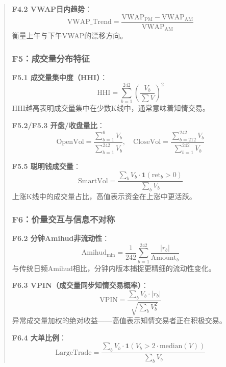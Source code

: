 \documentclass[12pt,a4paper]{article}
\begin{document}
\begin{abstract}
\textbf{F4.2 VWAP日内趋势}：
\begin{equation}
    \text{VWAP\_Trend} = \frac{\text{VWAP}_{\text{PM}} - \text{VWAP}_{\text{AM}}}{\text{VWAP}_{\text{AM}}}
\end{equation}
衡量上午与下午VWAP的漂移方向。

\subsubsection{F5：成交量分布特征}

\textbf{F5.1 成交量集中度（HHI）}：
\begin{equation}
    \text{HHI} = \sum_{b=1}^{242} \left(\frac{V_b}{\sum V}\right)^2
\end{equation}
HHI越高表明成交量集中在少数K线中，通常意味着知情交易。

\textbf{F5.2/F5.3 开盘/收盘量比}：
\begin{equation}
    \text{OpenVol} = \frac{\sum_{b=1}^{6} V_b}{\sum_{b=1}^{242} V_b}, \quad \text{CloseVol} = \frac{\sum_{b=212}^{242} V_b}{\sum_{b=1}^{242} V_b}
\end{equation}

\textbf{F5.5 聪明钱成交量}：
\begin{equation}
    \text{SmartVol} = \frac{\sum_b V_b \cdot \mathbf{1}(\text{ret}_b > 0)}{\sum_b V_b}
\end{equation}
上涨K线中的成交量占比，高值表示资金在上涨中更活跃。

\subsubsection{F6：价量交互与信息不对称}

\textbf{F6.2 分钟Amihud非流动性}：
\begin{equation}
    \text{Amihud}_{\text{min}} = \frac{1}{242}\sum_{b=1}^{242} \frac{|r_b|}{\text{Amount}_b}
\end{equation}
与传统日频Amihud相比，分钟内版本捕捉更精细的流动性变化。

\textbf{F6.3 VPIN（成交量同步知情交易概率）}：
\begin{equation}
    \text{VPIN} = \frac{\sum_b V_b \cdot |r_b|}{\sqrt{\sum_b V_b^2}}
\end{equation}
异常成交量加权的绝对收益——高值表示知情交易者正在积极交易。

\textbf{F6.4 大单比例}：
\begin{equation}
    \text{LargeTrade} = \frac{\sum_b V_b \cdot \mathbf{1}(V_b > 2 \cdot \text{median}(V))}{\sum_b V_b}
\end{equation}


\end{abstract}
\end{document}
